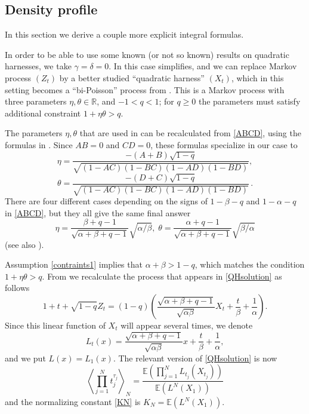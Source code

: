 \documentclass{amsart}
\theoremstyle{definition}
\theoremstyle{remark}
\theoremstyle{remark}
\theoremstyle{definition}
\numberwithin{equation}{section}
\begin{document}
\subsection{Density profile}\label{Sect:DP} In this section we derive a couple more explicit integral formulas.

In order to be able to use some known (or not so known) results on quadratic harnesses, we take $\gamma=\delta=0$.
 In this case \cite[formula (2.28)]{Bryc-Wesolowski-08} simplifies, and we
  can replace Markov process $(Z_t)$ by a better studied ``quadratic harness'' $(X_t)$, which in this setting becomes a
  ``bi-Poisson'' process from \cite{Bryc-Matysiak-Wesolowski-04b}. This is a Markov process with three parameters $\eta,\theta\in{\mathds{R}}$,
  and $-1<q<1$; for $q\geq 0$ the parameters must satisfy additional constraint $1+\eta\theta>q$.

  The parameters $\eta,\theta$ that are used in  \cite{Bryc-Matysiak-Wesolowski-04b} can be recalculated from \eqref{ABCD},
 using the formulas in \cite[Theorem 1.1]{Bryc-Wesolowski-08}. Since $AB=0$ and $CD=0$, these formulas specialize in our case to
  $$\eta=\frac{ -(A+B)   \sqrt{1-q}}{\sqrt{(1-A C) (1-B C) (1-A D) (1-B D)  }}\label{eta},$$
  $$\theta=\frac{ -(D+C)  \sqrt{1-q}}{\sqrt{(1-A C) (1-B C) (1-A D) (1-B D)  }}\label{theta}\,.$$
 There are four different cases depending on the
 signs of $1-\beta-q$ and $1-\alpha-q$ in \eqref{ABCD}, but they all give the same final answer
    {}
 \begin{equation}
   \label{eta-theta}
   \eta=\frac{\beta +q - 1}{\sqrt{\alpha+\beta+q-1}}\sqrt{\alpha/\beta},
   \;
   \theta=\frac{\alpha+q-1}{\sqrt{\alpha+\beta+q-1}} \sqrt{\beta/\alpha}
 \end{equation}
 (see also \cite[Section 5.2]{Bryc-Wesolowski-08}).

Assumption \eqref{contraints1} implies that $\alpha+\beta>1-q$, which matches the condition $1+\eta\theta>q$.
{}
 From \cite[(2.28)]{Bryc-Wesolowski-08} we recalculate the process that appears in \eqref{QHsolution} as follows
 \begin{equation}
   \label{X2Z}
   1+t+\sqrt{1-q}Z_t=(1-q)\left(\frac{\sqrt{\alpha+\beta+q-1}}{\sqrt{\alpha\beta}}X_t+\frac{t}{\beta}+\frac{1}{\alpha}\right).
 \end{equation}
 Since this linear function of $X_t$ will appear several times, we  denote
 \begin{equation}
   \label{L(x)}L_t(x)=\frac{\sqrt{\alpha+\beta+q-1}}{\sqrt{\alpha\beta}}x+\frac{t}{\beta}+\frac{1}{\alpha},
 \end{equation}
  and we put  $L(x)=L_1(x)$.
 The relevant version of \eqref{QHsolution} is now
 \begin{equation}
   \label{QH-biP}
   \left\langle \prod_{j=1}^N t_j^{\tau_j}\right\rangle_N=\frac{{\mathds{E}}\left(\prod_{j=1}^NL_{t_j}(X_{t_j})\right)}{{\mathds{E}}\left(L^N(X_1)\right)}
 \end{equation}
 and the normalizing constant \eqref{KN} is $K_N={\mathds{E}}\left(L^N(X_1)\right)$.
\end{document}
